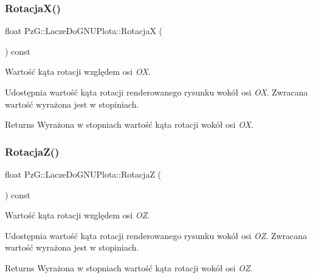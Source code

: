 \subsubsection{\texorpdfstring{RotacjaX()}{RotacjaX()}}
{\footnotesize\ttfamily float Pz\+G\+::\+Lacze\+Do\+G\+N\+U\+Plota\+::\+RotacjaX (\begin{DoxyParamCaption}{ }\end{DoxyParamCaption}) const\hspace{0.3cm}{\ttfamily [inline]}}



Wartość kąta rotacji względem osi {\itshape OX}. 

Udostępnia wartość kąta rotacji renderowanego rysunku wokół osi {\itshape OX}. Zwracana wartość wyrażona jest w stopiniach. \begin{DoxyReturn}{Returns}
Wyrażona w stopniach wartość kąta rotacji wokół osi {\itshape OX}. 
\end{DoxyReturn}
\mbox{\label{class_pz_g_1_1_lacze_do_g_n_u_plota_a9dac73754fab10644b287756003e9c79}} 
\subsubsection{\texorpdfstring{RotacjaZ()}{RotacjaZ()}}
{\footnotesize\ttfamily float Pz\+G\+::\+Lacze\+Do\+G\+N\+U\+Plota\+::\+RotacjaZ (\begin{DoxyParamCaption}{ }\end{DoxyParamCaption}) const\hspace{0.3cm}{\ttfamily [inline]}}



Wartość kąta rotacji względem osi {\itshape OZ}. 

Udostępnia wartość kąta rotacji renderowanego rysunku wokół osi {\itshape OZ}. Zwracana wartość wyrażona jest w stopiniach. \begin{DoxyReturn}{Returns}
Wyrażona w stopniach wartość kąta rotacji wokół osi {\itshape OZ}. 
\end{DoxyReturn}
\mbox{\label{class_pz_g_1_1_lacze_do_g_n_u_plota_a065f5b8402737cc62b0ad4f66d028335}} 
